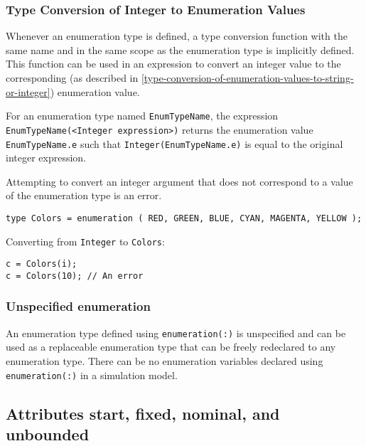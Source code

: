 \subsubsection{Type Conversion of Integer to Enumeration Values}\label{type-conversion-of-integer-to-enumeration-values}

Whenever an enumeration type is defined, a type conversion function with
the same name and in the same scope as the enumeration type is
implicitly defined. This function can be used in an expression to
convert an integer value to the corresponding (as described in \cref{type-conversion-of-enumeration-values-to-string-or-integer}) enumeration value.

For an enumeration type named \lstinline!EnumTypeName!, the expression
\lstinline!EnumTypeName(<Integer expression>)! returns the
enumeration value \lstinline!EnumTypeName.e! such that \lstinline!Integer(EnumTypeName.e)! is
equal to the original integer expression.

Attempting to convert an integer argument that does not correspond to a
value of the enumeration type is an error.

\begin{example}
\begin{lstlisting}[language=modelica]
type Colors = enumeration ( RED, GREEN, BLUE, CYAN, MAGENTA, YELLOW );
\end{lstlisting}

Converting from \lstinline!Integer! to \lstinline!Colors!:
\begin{lstlisting}[language=modelica]
c = Colors(i);
c = Colors(10); // An error
\end{lstlisting}
\end{example}

\subsubsection{Unspecified enumeration}\label{unspecified-enumeration}

An enumeration type defined using \lstinline!enumeration(:)! is unspecified and can
be used as a replaceable enumeration type that can be freely redeclared
to any enumeration type. There can be no enumeration variables declared
using \lstinline!enumeration(:)! in a simulation model.



\subsection{Attributes start, fixed, nominal, and unbounded}\label{attributes-start-fixed-nominal-and-unbounded}

